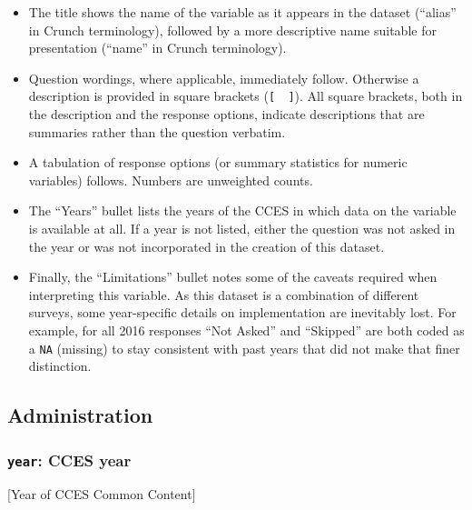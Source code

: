 \documentclass[10pt,article,oneside]{memoir}
\theoremstyle{definition}
\begin{document}
\begin{itemize}
\tightlist
\item
  The title shows the name of the variable as it appears in the dataset
  (``alias'' in Crunch terminology), followed by a more descriptive name
  suitable for presentation (``name'' in Crunch terminology).
\item
  Question wordings, where applicable, immediately follow. Otherwise a
  description is provided in square brackets (\texttt{{[}\ \ {]}}). All
  square brackets, both in the description and the response options,
  indicate descriptions that are summaries rather than the question
  verbatim.
\item
  A tabulation of response options (or summary statistics for numeric
  variables) follows. Numbers are unweighted counts.
\item
  The ``Years'' bullet lists the years of the CCES in which data on the
  variable is available at all. If a year is not listed, either the
  question was not asked in the year or was not incorporated in the
  creation of this dataset.
\item
  Finally, the ``Limitations'' bullet notes some of the caveats required
  when interpreting this variable. As this dataset is a combination of
  different surveys, some year-specific details on implementation are
  inevitably lost. For example, for all 2016 responses ``Not Asked'' and
  ``Skipped'' are both coded as a \texttt{NA} (missing) to stay
  consistent with past years that did not make that finer distinction.
\end{itemize}

\hypertarget{administration}{%
\subsection{Administration}\label{administration}}

\hypertarget{year-cces-year}{%
\subsubsection{\texorpdfstring{\texttt{year}: CCES
year}{year: CCES year}}\label{year-cces-year}}

{[}Year of CCES Common Content{]}
\end{document}
